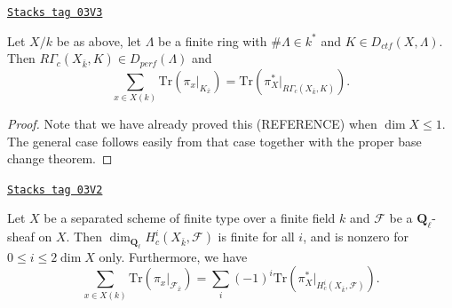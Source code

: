

\begin{theorem}[D]
\label{trace-theorem-D}
\href{https://stacks.math.columbia.edu/tag/03V3}{\texttt{Stacks tag 03V3}}

Let $X/k$ be as above, let $\Lambda$ be a finite ring with $\#\Lambda \in k^*$
and $K\in D_{ctf}(X, \Lambda)$. Then $R\Gamma_c(X_{\bar k}, K)\in
D_{perf}(\Lambda)$ and
$$
\sum_{x\in X(k)}\text{Tr}\left(\pi_x |_{K_{\bar x}}\right) =
\text{Tr}\left(\pi_X^* |_{R\Gamma_c(X_{\bar k}, K )}\right).
$$
\end{theorem}

\begin{proof}
Note that we have already proved this (REFERENCE) when $\dim X \leq 1$. The
general case follows easily from that case together with the proper base change
theorem.
\end{proof}

\begin{theorem}[C]
\label{trace-theorem-C}
\href{https://stacks.math.columbia.edu/tag/03V2}{\texttt{Stacks tag 03V2}}

Let $X$ be a separated scheme of finite type over a finite field $k$ and
$\mathcal{F}$ be a $\mathbf{Q}_\ell$-sheaf on $X$. Then
$\dim_{\mathbf{Q}_\ell}H_c^i(X_{\bar k}, \mathcal{F})$ is finite for all $i$,
and is nonzero for $0\leq i \leq 2 \dim X$ only. Furthermore, we have
$$
\sum_{x\in X(k)} \text{Tr}\left(\pi_x |_{\mathcal{F}_{\bar x}}\right) =
\sum_i (-1)^i\text{Tr}\left(\pi_X^* |_{H_c^i(X_{\bar k}, \mathcal{F})}\right).
$$
\end{theorem}

